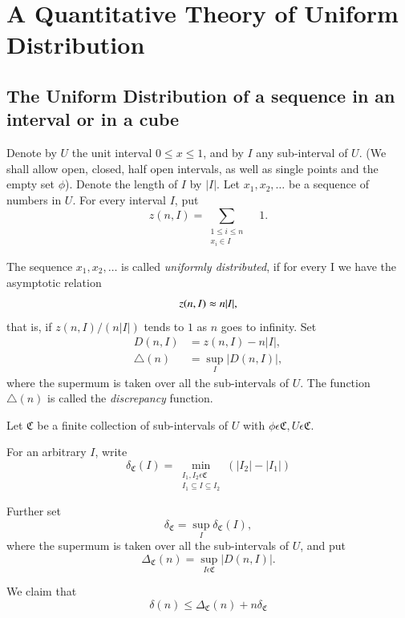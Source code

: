 \chapter{A Quantitative Theory of Uniform Distribution}\label{chap1}

\section[The Uniform Distribution of a sequence...]{The Uniform
  Distribution of a sequence in an interval or in a
  cube}\label{chap1:sec1}\pageoriginale   

Denote by $U$ the unit interval $0 \leq x \leq 1$, and by $I$ any sub-interval of $U$. (We shall allow open, closed, half open intervals, as well as single points and the empty set $\phi$). Denote the length of $I$ by $|I|$. Let $x_{1}, x_{2}, \ldots$ be a sequence of numbers in $U$. For every interval $I$, put
$$
z(n, I) = \sum_{\substack{1\leq i \leq n\\ x_{i} \in I}}\quad 1.
$$

The sequence $x_{1}, x_{2}, \ldots$ is called {\em uniformly distributed}, if for every I we have the asymptotic relation
$$
z(n, I) \thickapprox n |I|,
$$
that is, if $z(n, I)/(n|I|)$ tends to $1$ as $n$ goes to infinity. Set
\begin{align*}
  D(n, I) &= z(n, I) - n|I|,\\
  \triangle(n) &= \sup\limits_{I} |D(n, I)|,
\end{align*}
where the supermum is taken over all the sub-intervals of $U$. The function $\triangle(n)$ is called the {\em discrepancy} function.

Let $\mathfrak{C}$ be a finite collection of sub-intervals of $U$ with $\phi \epsilon \mathfrak{C}, U \epsilon \mathfrak{C}$.

For an arbitrary $I$, write
$$
\delta_{\mathfrak{C}} (I) = \min_{\substack{I_{1}, I_{2} \epsilon \mathfrak{C}\\I_{1} \subseteq I \subseteq I_{2}}} (|I_{2}| - |I_{1}|)
$$

Further set
$$
\delta_{\mathfrak{C}} = \sup\limits_{I} \delta_{\mathfrak{C}} (I),
$$\pageoriginale
where the supermum is taken over all the sub-intervals of $U$, and put
$$
\Delta_{\mathfrak{C}}(n) = \sup\limits_{I \epsilon \mathfrak{C}} |D(n, I)|.
$$

We claim that
\begin{equation*}
\delta(n)\leq \Delta_{\mathfrak{C}} (n) + n\delta_{\mathfrak{C}}\tag{1.1}\label{chap1:sec1:eq1.1}
\end{equation*}

